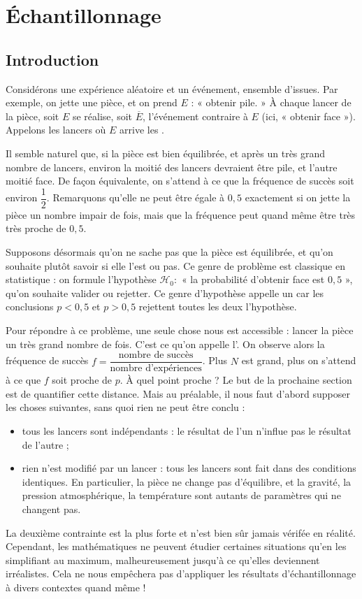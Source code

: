 
\chapter{Échantillonnage}
\label{chap:échantillonage}

\section{Introduction}

Considérons une expérience aléatoire et un événement, ensemble d'issues.
Par exemple, on jette une pièce, et on prend $E$ : « obtenir pile. »
À chaque lancer de la pièce, soit $E$ se réalise, soit $\overline{E}$, l'événement contraire à $E$ (ici, « obtenir face »).
Appelons les lancers où $E$ arrive les .

Il semble naturel que, si la pièce est bien équilibrée, et après un très grand nombre de lancers, environ la moitié des lancers devraient être pile, et l'autre moitié face.
De façon équivalente, on s'attend à ce que la fréquence de succès soit environ $\dfrac12$.
Remarquons qu'elle ne peut être égale à $0,5$ exactement si on jette la pièce un nombre impair de fois, mais que la fréquence peut quand même être très très proche de $0,5$.

Supposons désormais qu'on ne sache pas que la pièce est équilibrée, et qu'on souhaite plutôt savoir si elle l'est ou pas.
Ce genre de problème est classique en statistique : on formule l'hypothèse $\mathcal{H}_0 :$ « la probabilité d'obtenir face est $0,5$ », qu'on souhaite valider ou rejetter.
Ce genre d'hypothèse appelle un  car les conclusions $p< 0,5$ et $p>0,5$ rejettent toutes les deux l'hypothèse.

Pour répondre à ce problème, une seule chose nous est accessible : lancer la pièce un très grand nombre de fois.
C'est ce qu'on appelle l'.
On observe alors la fréquence de succès $f = \dfrac{\text{nombre de succès}}{\text{nombre d'expériences}}$.
Plus $N$ est grand, plus on s'attend à ce que $f$ soit proche de $p$. À quel point proche ? Le but de la prochaine section est de quantifier cette distance.
Mais au préalable, il nous faut d'abord supposer les choses suivantes, sans quoi rien ne peut être conclu :
	\begin{itemize}
		\item tous les lancers sont indépendants : le résultat de l'un n'influe pas le résultat de l'autre ;
		\item rien n'est modifié par un lancer : tous les lancers sont fait dans des conditions identiques. En particulier, la pièce ne change pas d'équilibre, et la gravité, la pression atmosphérique, la température sont autants de paramètres qui ne changent pas.
	\end{itemize}
La deuxième contrainte est la plus forte et n'est bien sûr jamais vérifée en réalité.
Cependant, les mathématiques ne peuvent étudier certaines situations qu'en les simplifiant au maximum, malheureusement jusqu'à ce qu'elles deviennent irréalistes.
Cela ne nous empêchera pas d'appliquer les résultats d'échantillonnage à divers contextes quand même !

